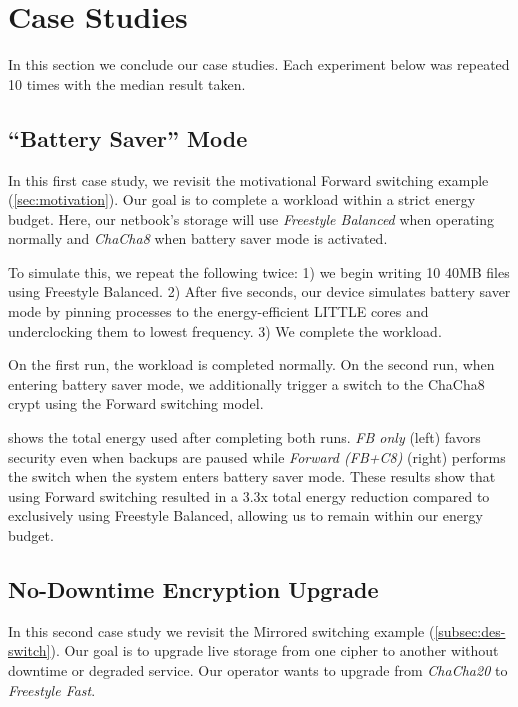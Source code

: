 \section{Case Studies}\label{sec:usecases}

In this section we conclude our case studies. Each experiment below was repeated
10 times with the median result taken.


\subsection{``Battery Saver'' Mode}\label{subsec:usecase-battery}

In this first case study, we revisit the motivational Forward switching example
(\cref{sec:motivation}). Our goal is to complete a workload within a strict
energy budget. Here, our netbook's storage will use {\em Freestyle Balanced}
when operating normally and {\em ChaCha8} when battery saver mode is activated.

To simulate this, we repeat the following twice: 1) we begin writing 10 40MB
files using Freestyle Balanced. 2) After five seconds, our device simulates
battery saver mode by pinning \sys processes to the energy-efficient LITTLE
cores and underclocking them to lowest frequency. 3) We complete the workload.



On the first run, the workload is completed normally. On the second run, when
entering battery saver mode, we additionally trigger a switch to the ChaCha8
crypt using the Forward switching model.

 shows the total energy used after completing both
runs. {\em FB only} (left) favors security even when backups are paused while
{\em Forward (FB+C8)} (right) performs the switch when the system enters battery
saver mode. These results show that using Forward switching resulted in a 3.3x
total energy reduction compared to exclusively using Freestyle Balanced,
allowing us to remain within our energy budget.


\subsection{No-Downtime Encryption Upgrade}\label{subsec:usecase-upgrade}

In this second case study we revisit the Mirrored switching example
(\cref{subsec:des-switch}). Our goal is to upgrade live storage from one cipher
to another without downtime or degraded service. Our operator wants to upgrade
from {\em ChaCha20} to {\em Freestyle Fast}.

